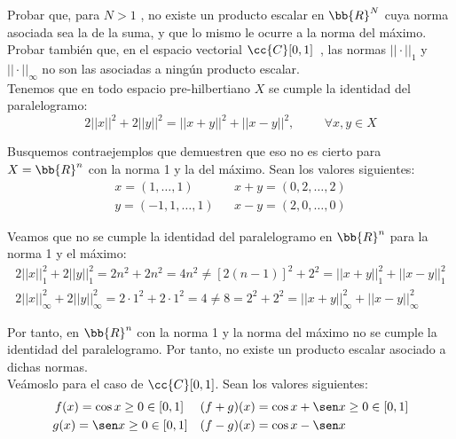 \begin{ejercicio}
    Probar que, para $N > 1$ , no existe un producto escalar en $\bb{R}^N$ cuya norma asociada sea la de la suma, y que lo mismo le ocurre a la norma del máximo. Probar también que, en el espacio vectorial $\cc{C}[0, 1]$~, las normas $|| \cdot ||_1 $ y $|| \cdot ||_\infty $ no son las asociadas a ningún producto escalar.\\

    Tenemos que en todo espacio pre-hilbertiano $X$ se cumple la identidad del paralelogramo:
    \begin{equation*}
        2||x||^2 + 2||y||^2 = ||x+y||^2 + ||x-y||^2, \hspace{1cm} \forall x,y\in X
    \end{equation*}
    
    Busquemos contraejemplos que demuestren que eso no es cierto para $X=\bb{R}^n$ con la norma 1 y la del máximo. Sean los valores siguientes:
    \begin{align*}
        x=(1,\dots, 1) && x+y = (0,2,\dots, 2) \\
        y=(-1,1,\dots, 1) && x-y = (2, 0, \dots, 0) 
    \end{align*}
    
    Veamos que no se cumple la identidad del paralelogramo en $\bb{R}^n$ para la norma 1 y el máximo:
    \begin{gather*}
        2||x||_1^2 + 2||y||_1^2 = 2n^2 + 2n^2 = 4n^2 \neq 
        [2(n-1)]^2 + 2^2 = ||x+y||_1^2 + ||x-y||_1^2 \\
        2||x||_\infty^2 + 2||y||_\infty^2 = 2\cdot 1^2 + 2\cdot 1^2 = 4 \neq 
        8= 2^2 + 2^2 = ||x+y||_\infty^2 + ||x-y||_\infty^2
    \end{gather*}

    Por tanto, en $\bb{R}^n$ con la norma 1 y la norma del máximo no se cumple la identidad del paralelogramo. Por tanto, no existe un producto escalar asociado a dichas normas.\\

    Veámoslo para el caso de $\cc{C}[0, 1]$. Sean los valores siguientes:
    \begin{align*}
        f(x)=\cos x\geq 0\in [0,1]~ &&& (f+g)(x)=\cos x + \sen x\geq 0 \in [0,1] \\
        g(x)=\sen x\geq 0\in [0,1] &&& (f-g)(x)=\cos x - \sen x
    \end{align*}


\end{ejercicio}
